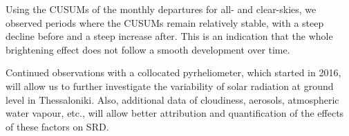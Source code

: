 \documentclass[applsci,article,submit,moreauthors,pdftex]{Definitions/mdpi}
\begin{document}
Using the CUSUMs of the monthly departures for all- and clear-skies, we
observed periods where the CUSUMs remain relatively stable, with a steep
decline before and a steep increase after. This is an indication that
the whole brightening effect does not follow a smooth development over
time.

Continued observations with a collocated pyrheliometer, which started in
2016, will allow us to further investigate the variability of solar
radiation at ground level in Thessaloniki. Also, additional data of
cloudiness, aerosols, atmospheric water vapour, etc., will allow better
attribution and quantification of the effects of these factors on SRD.


\vspace{6pt}












\end{document}
